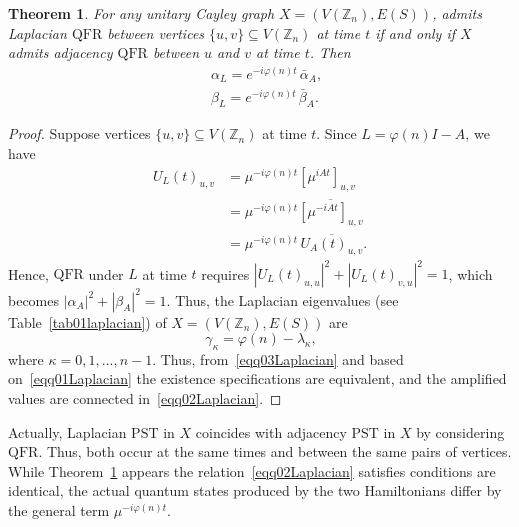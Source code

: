 \documentclass[12pt]{amsart}
\newtheorem{theorem}{Theorem}[section]
\newcommand{\QFR}{\mathrm{QFR}}
\newcommand{\PST}{\mathrm{PST}}
\begin{document}
\begin{theorem}\label{thm001Laplacian}
For any unitary Cayley graph $X = (V(\mathbb{Z}_n),E(S))$, admits Laplacian $\QFR$ between vertices $\{u,v\}\subseteq V(\mathbb{Z}_n)$ at time $t$ if and only if $X$ admits adjacency $\QFR$ between
  $u$ and $v$ at time $t$. Then
 \begin{equation}~\label{eqq02Laplacian}
 \begin{aligned}
 &\alpha_L = e^{-i\varphi(n)t}\,\bar{\alpha}_A,\\
 &\beta_L  = e^{-i\varphi(n)t}\,\bar{\beta}_A.
 \end{aligned}
\end{equation}
\end{theorem}
\begin{proof}
Suppose vertices $\{u,v\}\subseteq V(\mathbb{Z}_n)$ at time $t$. 
 Since $L = \varphi(n)I - A$, we have
 \begin{align*}
 U_L(t)_{u,v}&=\mu^{-i\varphi(n)t}[\mu^{iAt}]_{u,v}\\
 &=\mu^{-i\varphi(n)t}\overline{[\mu^{-iAt}]_{u,v}}\\
 & =\mu^{-i\varphi(n)t}\,\overline{U_A(t)_{u,v}}.
 \end{align*}
Hence, $\QFR$ under $L$ at time $t$ requires $|U_L(t)_{u,u}|^2+|U_L(t)_{v,u}|^2=1$, which becomes
  $|\alpha_A|^2+|\beta_A|^2=1$.   Thus, the Laplacian eigenvalues (see Table~\ref{tab01laplacian}) of $X = (V(\mathbb{Z}_n),E(S))$ are
\begin{equation}~\label{eqq03Laplacian}
  \gamma_\kappa=\varphi(n)-\lambda_\kappa,
\end{equation}
where $\kappa= 0, 1, \ldots, n-1.$ 
Thus, from~\eqref{eqq03Laplacian} and based on~\eqref{eqq01Laplacian} the existence specifications are equivalent, and the amplified values are connected in~\eqref{eqq02Laplacian}.
\end{proof}

 Actually, Laplacian $\PST$ in $X$ coincides with adjacency $\PST$ in $X$ by considering $\QFR$. Thus, both occur at the same times and   between the same pairs of vertices.
  While Theorem~\ref{thm001Laplacian} appears the relation~\eqref{eqq02Laplacian} satisfies conditions are identical, the actual
  quantum states produced by the two Hamiltonians differ by the general term $\mu^{-i\varphi(n)t}$.
\end{document}
